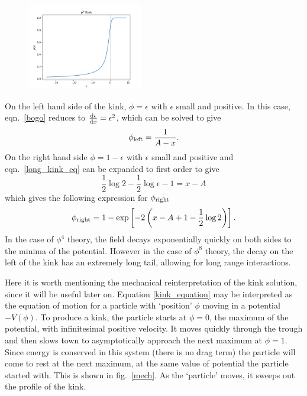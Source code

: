 \documentclass[11pt, oneside,titlepage]{article}  	%
\numberwithin{equation}{section}
\newcommand{\drv}{\ensuremath{\textup{d}}}
\begin{document}
  \begin{figure}
\centering
 \includegraphics[width=0.45\textwidth]{phi8_kink.png}
  \label{phi8kink}
\end{figure}
 On the left hand side of the kink, $\phi = \epsilon$ with $\epsilon$ small and positive. In this case, eqn.~\ref{bogo} reduces to $\frac{\drv \epsilon}{\drv x} = \epsilon^2$, which can be solved to give 
 \begin{equation}
 \phi_\textup{left} = \frac{1}{A-x}.
 \end{equation}
 On the right hand side $\phi = 1- \epsilon$ with $\epsilon$ small and positive and eqn.~\ref{long_kink_eq} can be expanded to first order to give
 \begin{equation}
 \frac{1}{2} \log2 - \frac{1}{2} \log \epsilon - 1 = x-A
 \end{equation}
 which gives the following expression for $\phi_{\textup{right}}$
 \begin{equation}
 \phi_{\textup{right}} = 1- \exp\left [ -2\left ( x - A + 1 - \frac{1}{2}\log2 \right ) \right ].
 \end{equation}
 In the case of $\phi^4$ theory, the field decays exponentially quickly on both sides to the minima of the potential. However in the case of $\phi^8$ theory, the decay on the left of the kink has an extremely long tail, allowing for long range interactions.\par
 Here it is worth mentioning the mechanical reinterpretation of the kink solution, since it will be useful later on. Equation \ref{kink_equation} may be interpreted as the equation of motion for a particle with `position' $\phi$ moving in a potential $-V(\phi)$. To produce a kink, the particle starts at $\phi = 0$, the maximum of the potential, with infinitesimal positive velocity. It moves quickly through the trough and then slows town to asymptotically approach the next maximum at $\phi = 1$. Since energy is conserved in this system (there is no drag term) the particle will come to rest at the next maximum, at the same value of potential the particle started with. This is shown in fig.~\ref{mech}. As the `particle' moves, it sweeps out the profile of the kink.\par
\end{document}
